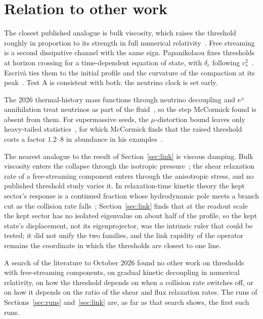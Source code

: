 \documentclass[11pt]{article}
\begin{document}
\section{Relation to other work}

The closest published analogue is bulk viscosity, which raises the threshold roughly in proportion to its strength in full numerical relativity~\cite{Yuwen}. Free streaming is a second dissipative channel with the same sign. Papanikolaou fixes thresholds at horizon crossing for a time-dependent equation of state, with $\delta_c$ following $c_s^2$~\cite{Pap}. Escriv\`a ties them to the initial profile and the curvature of the compaction at its peak~\cite{Esc}. Test A is consistent with both: the neutrino clock is set early.

The 2026 thermal-history mass functions through neutrino decoupling and e$^\pm$ annihilation treat neutrinos as part of the fluid~\cite{Gonin}, so the step McCormick found is absent from them. For supermassive seeds, the $\mu$-distortion bound leaves only heavy-tailed statistics~\cite{Dave}, for which McCormick finds that the raised threshold costs a factor $1.2$--$8$ in abundance in his examples~\cite{McC}.

The nearest analogue to the result of Section~\ref{sec:link} is viscous damping. Bulk viscosity enters the collapse through the isotropic pressure~\cite{Yuwen}; the shear relaxation rate of a free-streaming component enters through the anisotropic stress, and no published threshold study varies it. In relaxation-time kinetic theory the kept sector's response is a continued fraction whose hydrodynamic pole meets a branch cut as the collision rate falls~\cite{Rom,Hu}; Section~\ref{sec:link} finds that at the readout scale the kept sector has no isolated eigenvalue on about half of the profile, so the kept state's displacement, not its eigenprojector, was the intrinsic ruler that could be tested; it did not unify the two families, and the link rapidity of the operator remains the coordinate in which the thresholds are closest to one line.

A search of the literature to October 2026 found no other work on thresholds with free-streaming components, on gradual kinetic decoupling in numerical relativity, on how the threshold depends on when a collision rate switches off, or on how it depends on the ratio of the shear and flux relaxation rates. The runs of Sections~\ref{sec:runs} and~\ref{sec:link} are, as far as that search shows, the first such runs.
\end{document}
